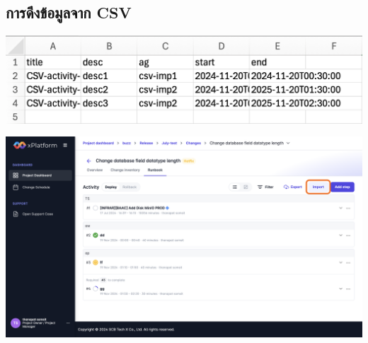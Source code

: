 \newpage
\subsection{การดึงข้อมูลจาก CSV}
\begin{center}
    \includegraphics[width=\linewidth]{resources/pages/change-runbook/import-csv/29.png}

    \vspace{1in}

    \includegraphics[width=\linewidth]{resources/pages/change-runbook/import-csv/30.png}
\end{center}
